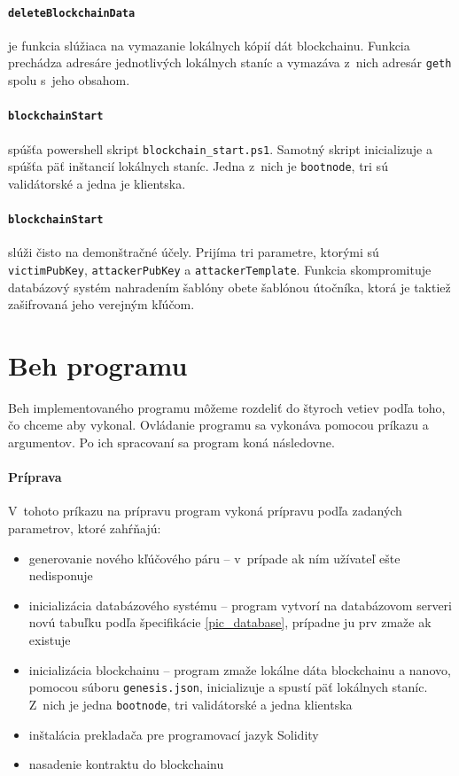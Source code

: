 \paragraph{\texttt{deleteBlockchainData}} je funkcia slúžiaca na vymazanie lokálnych kópií dát blockchainu. Funkcia prechádza adresáre jednotlivých lokálnych staníc a vymazáva z~nich adresár \texttt{geth} spolu s~jeho obsahom.

\paragraph{\texttt{blockchainStart}} spúšťa powershell skript \texttt{blockchain\_start.ps1}. Samotný skript inicializuje a spúšťa päť inštancií lokálnych staníc. Jedna z~nich je \texttt{bootnode}, tri sú validátorské a jedna je klientska.

\paragraph{\texttt{blockchainStart}} slúži čisto na demonštračné účely. Prijíma tri parametre, ktorými sú  \texttt{victimPubKey}, \texttt{attackerPubKey} a \texttt{attackerTemplate}. Funkcia skompromituje databázový systém nahradením šablóny obete šablónou útočníka, ktorá je taktiež zašifrovaná jeho verejným kľúčom.

\section{Beh programu}

Beh implementovaného programu môžeme rozdeliť do štyroch vetiev podľa toho, čo chceme aby vykonal. Ovládanie programu sa vykonáva pomocou príkazu a argumentov. Po ich spracovaní sa program koná následovne.

\paragraph{Príprava}
V~tohoto príkazu na prípravu program vykoná prípravu podľa zadaných parametrov, ktoré zahŕňajú:
\begin{itemize}
  \item{generovanie nového kľúčového páru -- v~prípade ak ním užívateľ ešte nedisponuje}
  \item{inicializácia databázového systému -- program vytvorí na databázovom serveri novú tabuľku podľa špecifikácie \ref{pic_database}, prípadne ju prv zmaže ak existuje}
  \item{inicializácia blockchainu -- program zmaže lokálne dáta blockchainu a nanovo, pomocou súboru \texttt{genesis.json}, inicializuje a spustí päť lokálnych staníc. Z~nich je jedna \texttt{bootnode}, tri validátorské a jedna klientska}
  \item{inštalácia prekladača pre programovací jazyk Solidity}
  \item{nasadenie kontraktu do blockchainu}
\end{itemize}

